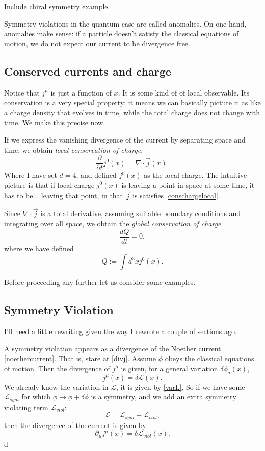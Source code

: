 \documentclass[main.tex]{subfiles}
\begin{document}
Include chiral symmetry example.

Symmetry violations in the quantum case are called anomalies. On one hand, anomalies make sense: if a particle doesn't satisfy the classical equations of motion, we do not expect our current to be divergence free. 
\subsection{Conserved currents and charge}

Notice that $j^\mu$ is just a function of $x$. It is some kind of of local observable. Its conservation is a very special property: it means we can basically picture it as like a charge density that evolves in time, while the total charge does not change with time. We make this precise now.

If we express the vanishing divergence of the current by separating space and time, we obtain \textit{local conservation of charge}:
\begin{equation} \label{conschargelocal}
\frac{\partial}{\partial t} j^0 (x) = \nabla \cdot \vec{j} (x).
\end{equation}
Where I have set $d = 4$, and defined $j^0 (x)$ as the local charge. The intuitive picture is that if local charge $j^0 (x)$ is leaving a point in space at some time, it has to be... leaving that point, in that $\vec{j}$ is satisfies \ref{conschargelocal}. 

Since $\nabla \cdot \vec{j}$ is a total derivative, assuming suitable boundary conditions and integrating over all space, we obtain the \textit{global conservation of charge}
\[
\frac{d Q }{dt} = 0,
\]
where we have defined
\[
Q := \int d^3 x j^0 (x).
\]

Before proceeding any further let us consider some examples.

\subsection{Symmetry Violation}
I'll need a little rewriting given the way I rewrote a couple of sections ago.

A symmetry violation appears as a divergence of the Noether current \ref{noethercurrent}. That is, stare at \ref{divj}. Assume $\phi$ obeys the classical equations of motion. Then the divergence of $j^\mu$ is given, for a general variation $\delta \phi_a (x)$,
\begin{equation} \label{varj}
j^\mu (x) = \delta \mathcal{L} (x).
\end{equation}
We already know the variation in $\mathcal{L}$, it is given by \ref{varL}. So if we have some $\mathcal{L}_{sym}$ for which $\phi \to \phi + \delta \phi$ is a symmetry, and we add an extra symmetry violating term $\mathcal{L}_{viol}$:
\[
\mathcal{L} = \mathcal{L}_{sym} + \mathcal{L}_{viol},
\]
then the divergence of the current is given by 
\[
\partial_\mu j^\mu (x) = \delta \mathcal{L}_{viol} (x).
\]
d
\end{document}
